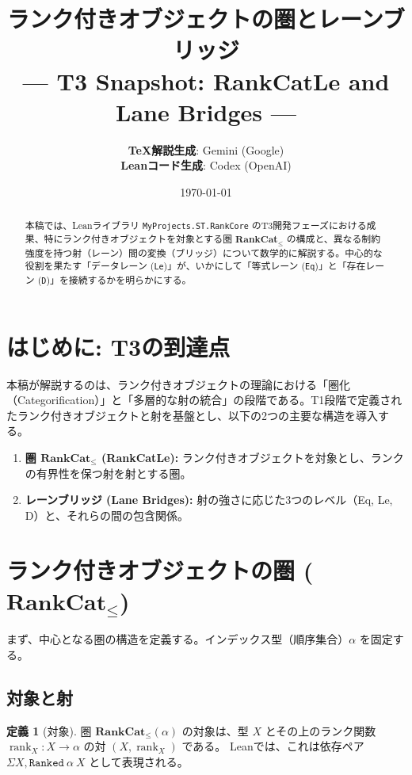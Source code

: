 \documentclass[a4paper,11pt]{article}
\title{\textbf{ランク付きオブジェクトの圏とレーンブリッジ}\\ \large --- T3 Snapshot: RankCatLe and Lane Bridges ---}
\author{
    \textbf{TeX解説生成}: Gemini (Google) \\
    \textbf{Leanコード生成}: Codex (OpenAI)
}
\date{\today}
\theoremstyle{definition}
\newtheorem{definition}{定義}[section]
\theoremstyle{plain}
\newcommand{\code}[1]{\texttt{#1}}
\newcommand{\rank}{\operatorname{rank}}
\newcommand{\RankCatLe}{\mathbf{RankCat}_{\le}}
\begin{document}
\maketitle

\begin{abstract}
本稿では、Leanライブラリ \code{MyProjects.ST.RankCore} のT3開発フェーズにおける成果、特にランク付きオブジェクトを対象とする圏 $\RankCatLe$ の構成と、異なる制約強度を持つ射（レーン）間の変換（ブリッジ）について数学的に解説する。中心的な役割を果たす「データレーン (\code{Le})」が、いかにして「等式レーン (\code{Eq})」と「存在レーン (\code{D})」を接続するかを明らかにする。
\end{abstract}

\tableofcontents

\section{はじめに: T3の到達点}
本稿が解説するのは、ランク付きオブジェクトの理論における「圏化（Categorification）」と「多層的な射の統合」の段階である。T1段階で定義されたランク付きオブジェクトと射を基盤とし、以下の2つの主要な構造を導入する。

\begin{enumerate}
    \item \textbf{圏 $\RankCatLe$ (RankCatLe):} ランク付きオブジェクトを対象とし、ランクの有界性を保つ射を射とする圏。
    \item \textbf{レーンブリッジ (Lane Bridges):} 射の強さに応じた3つのレベル（Eq, Le, D）と、それらの間の包含関係。
\end{enumerate}

\section{ランク付きオブジェクトの圏 ($\RankCatLe$)}

まず、中心となる圏の構造を定義する。インデックス型（順序集合）$\alpha$ を固定する。

\subsection{対象と射}

\begin{definition}[対象]
圏 $\RankCatLe(\alpha)$ の対象は、型 $X$ とその上のランク関数 $\rank_X : X \to \alpha$ の対 $(X, \rank_X)$ である。
Leanでは、これは依存ペア $\Sigma X, \code{Ranked}\ \alpha\ X$ として表現される。
\end{definition}
\end{document}
